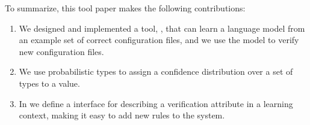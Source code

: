 To summarize, this tool paper makes the following contributions:

\begin{enumerate}

  \item We designed and implemented a tool, \app, that can learn a
language model from an example set of correct configuration files, and
we use the model to verify new configuration files.
  \item We use probabilistic types to assign a confidence distribution over a set of types to a value.
  \item In \app we define a interface for describing a verification attribute in a learning context, making it easy to add new rules to the system.

\end{enumerate}
